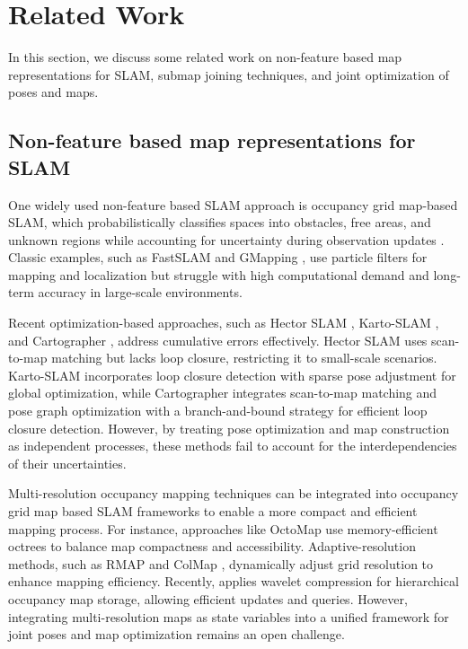 \section{Related Work}
\label{Sec_related_work}

In this section, we discuss some related work on non-feature based map representations for SLAM, submap joining techniques, and joint optimization of poses and maps. 

\subsection{Non-feature based map representations for SLAM}\label{Sec_related_a}
One widely used non-feature based SLAM approach is occupancy grid map-based SLAM, which probabilistically classifies spaces into obstacles, free areas, and unknown regions while accounting for uncertainty during observation updates \cite{moravec1985high, moravec1989sensor, elfes1989occupancy, martin1996robot, hornung2013octomap}. Classic examples, such as FastSLAM \cite{montemerlo2002fastslam} and GMapping \cite{grisetti2005improving}, use particle filters for mapping and localization but struggle with high computational demand and long-term accuracy in large-scale environments.

Recent optimization-based approaches, such as Hector SLAM \cite{kohlbrecher2011flexible}, Karto-SLAM \cite{konolige2010efficient}, and Cartographer \cite{hess2016real}, address cumulative errors effectively. Hector SLAM uses scan-to-map matching but lacks loop closure, restricting it to small-scale scenarios. Karto-SLAM incorporates loop closure detection with sparse pose adjustment for global optimization, while Cartographer integrates scan-to-map matching and pose graph optimization with a branch-and-bound strategy for efficient loop closure detection. However, by treating pose optimization and map construction as independent processes, these methods fail to account for the interdependencies of their uncertainties.

Multi-resolution occupancy mapping techniques can be integrated into occupancy grid map based SLAM frameworks to enable a more compact and efficient mapping process. For instance, approaches like OctoMap \cite{hornung2013octomap} use memory-efficient octrees to balance map compactness and accessibility. Adaptive-resolution methods, such as RMAP \cite{khan2014rmap} and ColMap \cite{fisher2021colmap}, dynamically adjust grid resolution to enhance mapping efficiency. Recently, \cite{Reijgwart-RSS-23} applies wavelet compression for hierarchical occupancy map storage, allowing efficient updates and queries. However, integrating multi-resolution maps as state variables into a unified framework for joint poses and map optimization remains an open challenge.


